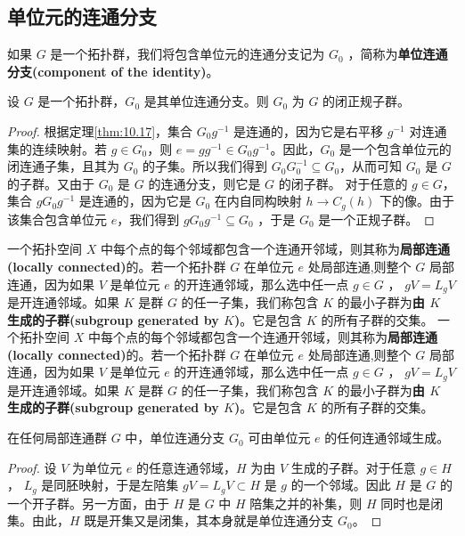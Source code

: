 \begin{theorem}
\begin{theorem}
\subsection{单位元的连通分支}

如果 $G$ 是一个拓扑群，我们将包含单位元的连通分支记为 $ G_{0}$ ，简称为\textbf{单位连通分支(component of the identity)}。

\begin{theorem}\label{eg:10.20}
	设 $G$ 是一个拓扑群，$G_{0}$ 是其单位连通分支。则 $G_{0}$ 为 $G$ 的闭正规子群。
\end{theorem}

\begin{proof}
	根据定理\ref{thm:10.17}，集合 $G_{0} g^{-1}$ 是连通的，因为它是右平移 $g^{-1}$ 对连通集的连续映射。若 $g\in G_{0}$，则 $e=gg^{-1} \in G_{0} g^{-1}$。因此，$G_{0}$ 是一个包含单位元的闭连通子集，且其为 $G_{0}$ 的子集。所以我们得到 $G_{0} G_{0}^{-1} \subseteq G_{0}$，从而可知 $G_{0}$ 是 $G$ 的子群。又由于 $G_{0}$ 是 $G$ 的连通分支，则它是 $G$ 的闭子群。
	对于任意的 $g\in G$，集合 $gG_{0} g^{-1}$ 是连通的，因为它是 $G_{0}$ 在内自同构映射 $h\rightarrow C_{g} (h)$ 下的像。由于该集合包含单位元 $e$，我们得到 $gG_{0} g^{-1} \subseteq G_{0}$ ，于是 $G_{0}$ 是一个正规子群。
\end{proof}

一个拓扑空间 $X$ 中每个点的每个邻域都包含一个连通开邻域，则其称为\textbf{局部连通(locally connected)}的。若一个拓扑群 $G$ 在单位元 $e$ 处局部连通,则整个 $G$ 局部连通，因为如果 $V$ 是单位元 $e$ 的开连通邻域，那么选中任一点 $g\in G$ ， $gV =L_{g} V$ 是开连通邻域。如果 $K$ 是群 $G$ 的任一子集，我们称包含 $K$ 的最小子群为\textbf{由 $K$ 生成的子群(subgroup generated by $ K$)}。它是包含 $K$ 的所有子群的交集。
一个拓扑空间 $X$ 中每个点的每个邻域都包含一个连通开邻域，则其称为\textbf{局部连通(locally connected)}的。若一个拓扑群 $G$ 在单位元 $e$ 处局部连通,则整个 $G$ 局部连通，因为如果 $V$ 是单位元 $e$ 的开连通邻域，那么选中任一点 $g\in G$ ， $gV =L_{g} V$ 是开连通邻域。如果 $K$ 是群 $G$ 的任一子集，我们称包含 $K$ 的最小子群为\textbf{由 $K$ 生成的子群(subgroup generated by $ K$)}。它是包含 $K$ 的所有子群的交集。

\begin{theorem}\label{eg:10.21}
	在任何局部连通群 $G$ 中，单位连通分支 $G_{0}$ 可由单位元 $e$ 的任何连通邻域生成。
\end{theorem}

\begin{proof}
	设 $V$ 为单位元 $e$ 的任意连通邻域，$H$ 为由 $V$ 生成的子群。对于任意 $g\in H$， $L_{g}$ 是同胚映射，于是左陪集 $gV=L_{g} V\subset H$ 是 $g$ 的一个邻域。因此 $H$ 是 $G$ 的一个开子群。另一方面，由于 $H$ 是 $G$ 中 $H$ 陪集之并的补集，则 $H$ 同时也是闭集。由此，$H$ 既是开集又是闭集，其本身就是单位连通分支 $G_{0}$。
\end{proof}


\end{theorem}
\end{theorem}
